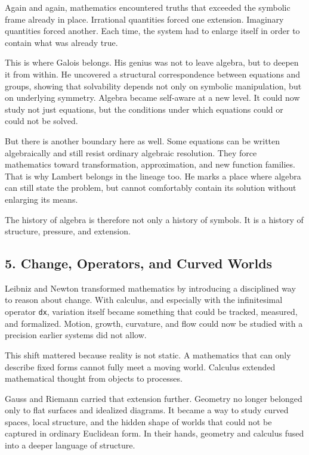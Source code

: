 \documentclass[
]{article}
\begin{document}
Again and again, mathematics encountered truths that exceeded the
symbolic frame already in place. Irrational quantities forced one
extension. Imaginary quantities forced another. Each time, the system
had to enlarge itself in order to contain what was already true.

This is where Galois belongs. His genius was not to leave algebra, but
to deepen it from within. He uncovered a structural correspondence
between equations and groups, showing that solvability depends not only
on symbolic manipulation, but on underlying symmetry. Algebra became
self-aware at a new level. It could now study not just equations, but
the conditions under which equations could or could not be solved.

But there is another boundary here as well. Some equations can be
written algebraically and still resist ordinary algebraic resolution.
They force mathematics toward transformation, approximation, and new
function families. That is why Lambert belongs in the lineage too. He
marks a place where algebra can still state the problem, but cannot
comfortably contain its solution without enlarging its means.

The history of algebra is therefore not only a history of symbols. It is
a history of structure, pressure, and extension.

\hypertarget{change-operators-and-curved-worlds}{%
\subsection{5. Change, Operators, and Curved
Worlds}\label{change-operators-and-curved-worlds}}

Leibniz and Newton transformed mathematics by introducing a disciplined
way to reason about change. With calculus, and especially with the
infinitesimal operator \texttt{dx}, variation itself became something
that could be tracked, measured, and formalized. Motion, growth,
curvature, and flow could now be studied with a precision earlier
systems did not allow.

This shift mattered because reality is not static. A mathematics that
can only describe fixed forms cannot fully meet a moving world. Calculus
extended mathematical thought from objects to processes.

Gauss and Riemann carried that extension further. Geometry no longer
belonged only to flat surfaces and idealized diagrams. It became a way
to study curved spaces, local structure, and the hidden shape of worlds
that could not be captured in ordinary Euclidean form. In their hands,
geometry and calculus fused into a deeper language of structure.
\end{document}
